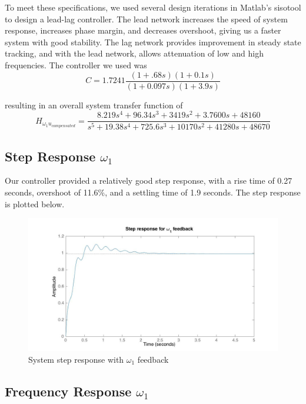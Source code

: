 \documentclass[11pt,titlepage]{article}
\begin{document}
		To meet these specifications, we used several design iterations in Matlab's sisotool to design a lead-lag controller. The lead network increases the speed of system response, increases phase margin, and decreases overshoot, giving us a faster system with good stability. The lag network provides improvement in steady state tracking, and with the lead network, allows attenuation of low and high frequencies. The controller we used was 
		\begin{equation*}
		C = 1.7241\frac{(1+ .68s)(1+0.1s)}{(1+0.097s)(1+3.9s)}
		\end{equation*}
		
		resulting in an overall system transfer function of 
		\begin{equation*}
		H_{\omega_1u_{compensated}}=\frac{8.219 s^4 + 96.34 s^3 + 3419 s^2 + 3.7600 s + 48160}{s^5 + 19.38 s^4 + 725.6 s^3 + 10170 s^2 + 41280 s + 48670}  
		\end{equation*}

	\subsection{Step Response $\omega_1$}
		Our controller provided a relatively good step response, with a rise time of  0.27 seconds, overshoot of 11.6\%, and a settling time of 1.9 seconds. The step response is plotted below.
		
      	\begin{figure}[H]
        		\centering
        		\includegraphics[trim={6cm 0 1cm 1cm},clip,origin=c,scale=0.35]{w1_step}
        		\caption{System step response with $\omega_1$ feedback}
        		\label{fig:w1_step}
    	\end{figure}
		
	\subsection{Frequency Response $\omega_1$}
	
\end{document}
